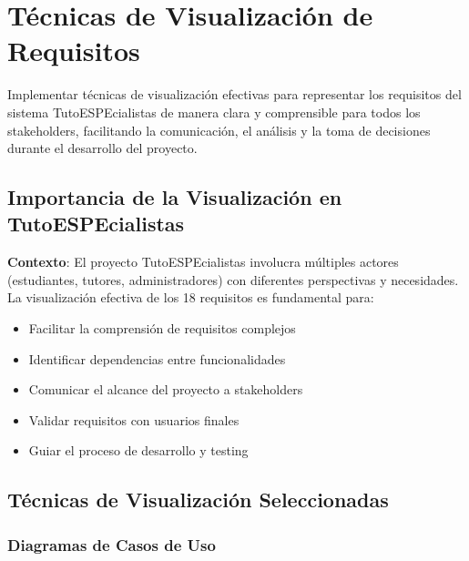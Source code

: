 \documentclass[12pt,a4paper]{article}
\begin{document}
\newpage

\section{Técnicas de Visualización de Requisitos}

\begin{tcolorbox}[colback=lightblue!10, colframe=headercolor, rounded corners, title=Objetivo de las Visualizaciones]
Implementar técnicas de visualización efectivas para representar los requisitos del sistema TutoESPEcialistas de manera clara y comprensible para todos los stakeholders, facilitando la comunicación, el análisis y la toma de decisiones durante el desarrollo del proyecto.
\end{tcolorbox}

\subsection{Importancia de la Visualización en TutoESPEcialistas}

\begin{tcolorbox}[colback=white, colframe=darkblue, rounded corners, boxrule=1pt]
\textbf{Contexto}: El proyecto TutoESPEcialistas involucra múltiples actores (estudiantes, tutores, administradores) con diferentes perspectivas y necesidades. La visualización efectiva de los 18 requisitos es fundamental para:

\begin{itemize}[itemsep=0.2em]
    \item Facilitar la comprensión de requisitos complejos
    \item Identificar dependencias entre funcionalidades
    \item Comunicar el alcance del proyecto a stakeholders
    \item Validar requisitos con usuarios finales
    \item Guiar el proceso de desarrollo y testing
\end{itemize}
\end{tcolorbox}

\subsection{Técnicas de Visualización Seleccionadas}

\subsubsection{Diagramas de Casos de Uso}
\end{document}
